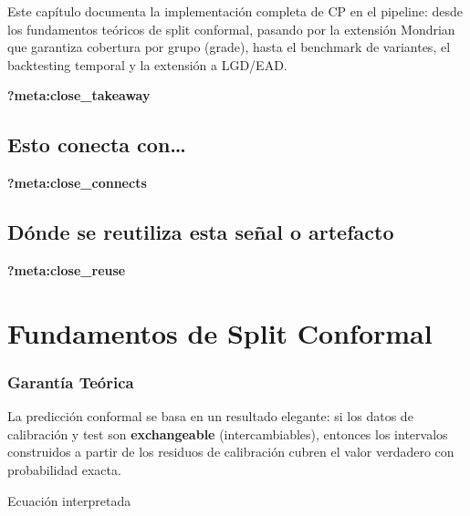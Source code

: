 \documentclass[
  spanish,
  11pt,
  letterpaper,
]{scrbook}
\theoremstyle{plain}
\theoremstyle{remark}
\begin{document}
Este capítulo documenta la implementación completa de CP en el pipeline:
desde los fundamentos teóricos de split conformal, pasando por la
extensión Mondrian que garantiza cobertura por grupo (grade), hasta el
benchmark de variantes, el backtesting temporal y la extensión a
LGD/EAD.

\begin{tcolorbox}[enhanced jigsaw, arc=.35mm, bottomrule=.15mm, bottomtitle=1mm, breakable, colback=white, colbacktitle=quarto-callout-tip-color!10!white, colframe=quarto-callout-tip-color-frame, coltitle=black, left=2mm, leftrule=.75mm, opacityback=0, opacitybacktitle=0.6, rightrule=.15mm, title=\textcolor{quarto-callout-tip-color}{\faLightbulb}\hspace{0.5em}{Qué debes quedarte}, titlerule=0mm, toprule=.15mm, toptitle=1mm]

\textbf{?meta:close\_takeaway}

\section{Esto conecta con\ldots{}}\label{esto-conecta-con-5}

\textbf{?meta:close\_connects}

\section{Dónde se reutiliza esta señal o
artefacto}\label{duxf3nde-se-reutiliza-esta-seuxf1al-o-artefacto-5}

\textbf{?meta:close\_reuse}

\end{tcolorbox}

\chapter{Fundamentos de Split Conformal}\label{sec-split-conformal}

\subsection{Garantía Teórica}\label{garantuxeda-teuxf3rica}

La predicción conformal se basa en un resultado elegante: si los datos
de calibración y test son \textbf{exchangeable} (intercambiables),
entonces los intervalos construidos a partir de los residuos de
calibración cubren el valor verdadero con probabilidad exacta.

{Ecuación interpretada}
\end{document}

